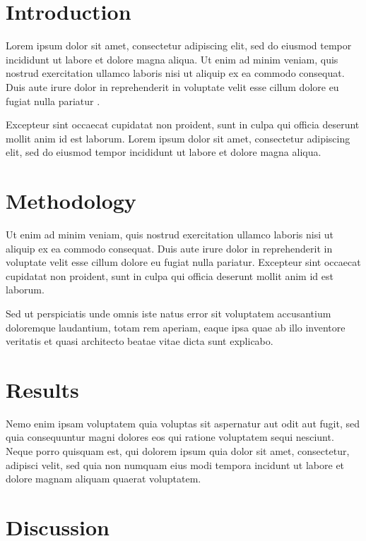 \section{Introduction}
\label{sec:introduction}

Lorem ipsum dolor sit amet, consectetur adipiscing elit, sed do eiusmod tempor
incididunt ut labore et dolore magna aliqua. Ut enim ad minim veniam, quis
nostrud exercitation ullamco laboris nisi ut aliquip ex ea commodo consequat.
Duis aute irure dolor in reprehenderit in voluptate velit esse cillum dolore eu
fugiat nulla pariatur \cite{lorem2024placeholder}.

Excepteur sint occaecat cupidatat non proident, sunt in culpa qui officia
deserunt mollit anim id est laborum. Lorem ipsum dolor sit amet, consectetur
adipiscing elit, sed do eiusmod tempor incididunt ut labore et dolore magna
aliqua.

\section{Methodology}
\label{sec:methodology}

Ut enim ad minim veniam, quis nostrud exercitation ullamco laboris nisi ut
aliquip ex ea commodo consequat. Duis aute irure dolor in reprehenderit in
voluptate velit esse cillum dolore eu fugiat nulla pariatur. Excepteur sint
occaecat cupidatat non proident, sunt in culpa qui officia deserunt mollit anim
id est laborum.

Sed ut perspiciatis unde omnis iste natus error sit voluptatem accusantium
doloremque laudantium, totam rem aperiam, eaque ipsa quae ab illo inventore
veritatis et quasi architecto beatae vitae dicta sunt explicabo.

\section{Results}
\label{sec:results}

Nemo enim ipsam voluptatem quia voluptas sit aspernatur aut odit aut fugit, sed
quia consequuntur magni dolores eos qui ratione voluptatem sequi nesciunt.
Neque porro quisquam est, qui dolorem ipsum quia dolor sit amet, consectetur,
adipisci velit, sed quia non numquam eius modi tempora incidunt ut labore et
dolore magnam aliquam quaerat voluptatem.

\section{Discussion}
\label{sec:discussion}

